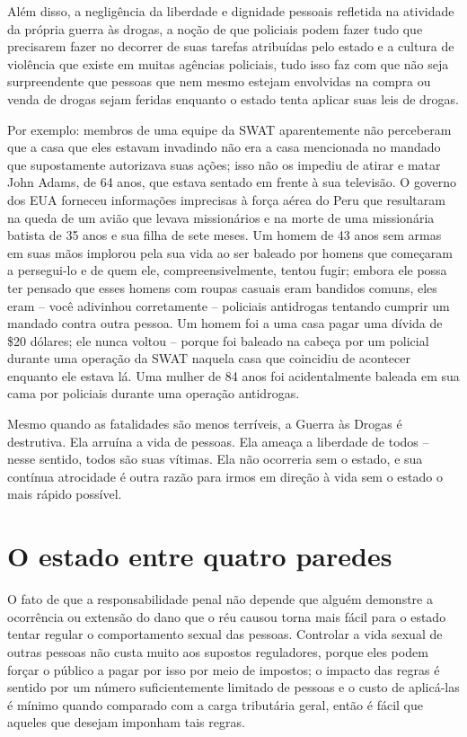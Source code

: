 Além disso, a negligência da liberdade e dignidade pessoais refletida na atividade da própria guerra às drogas, a noção de que policiais podem fazer tudo que precisarem fazer no decorrer de suas tarefas atribuídas pelo estado e a cultura de violência que existe em muitas agências policiais, tudo isso faz com que não seja surpreendente que pessoas que nem mesmo estejam envolvidas na compra ou venda de drogas sejam feridas enquanto o estado tenta aplicar suas leis de drogas.

Por exemplo: membros de uma equipe da SWAT aparentemente não perceberam que a casa que eles estavam invadindo não era a casa mencionada no mandado que supostamente autorizava suas ações; isso não os impediu de atirar e matar John Adams, de 64 anos, que estava sentado em frente à sua televisão. O governo dos EUA forneceu informações imprecisas à força aérea do Peru que resultaram na queda de um avião que levava missionários e na morte de uma missionária batista de 35 anos e sua filha de sete meses. Um homem de 43 anos sem armas em suas mãos implorou pela sua vida ao ser baleado por homens que começaram a persegui-lo e de quem ele, compreensivelmente, tentou fugir; embora ele possa ter pensado que esses homens com roupas casuais eram bandidos comuns, eles eram -- você adivinhou corretamente -- policiais antidrogas tentando cumprir um mandado contra outra pessoa. Um homem foi a uma casa pagar uma dívida de \$20 dólares; ele nunca voltou -- porque foi baleado na cabeça por um policial durante uma operação da SWAT naquela casa que coincidiu de acontecer enquanto ele estava lá. Uma mulher de 84 anos foi acidentalmente baleada em sua cama por policiais durante uma operação antidrogas.

Mesmo quando as fatalidades são menos terríveis, a Guerra às Drogas é destrutiva. Ela arruína a vida de pessoas. Ela ameaça a liberdade de todos -- nesse sentido, todos são suas vítimas. Ela não ocorreria sem o estado, e sua contínua atrocidade é outra razão para irmos em direção à vida sem o estado o mais rápido possível.

\section{O estado entre quatro paredes}

O fato de que a responsabilidade penal não depende que alguém demonstre a ocorrência ou extensão do dano que o réu causou torna mais fácil para o estado tentar regular o comportamento sexual das pessoas. Controlar a vida sexual de outras pessoas não custa muito aos supostos reguladores, porque eles podem forçar o público a pagar por isso por meio de impostos; o impacto das regras é sentido por um número suficientemente limitado de pessoas e o custo de aplicá-las é mínimo quando comparado com a carga tributária geral, então é fácil que aqueles que desejam imponham tais regras.


